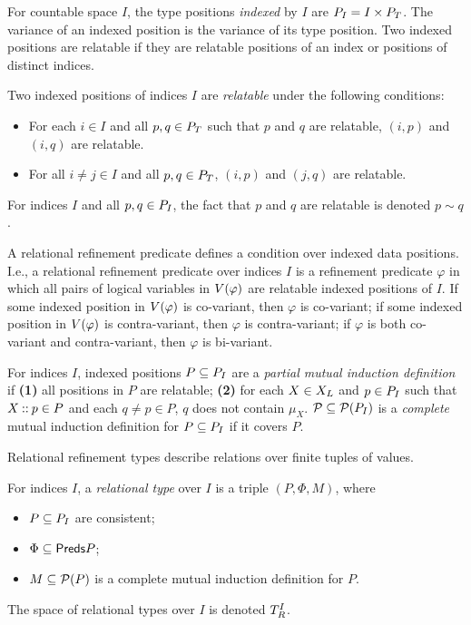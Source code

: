 For countable space $I$, the type positions \emph{indexed} by $I$ are
$P_{I} = I \times P_T$.
%
The variance of an indexed position is the variance of its type
position.
%
Two indexed positions are relatable if they are relatable positions of
an index or positions of distinct indices.
%
\begin{defn}
  \label{defn:reltable-idx-pos}
  Two indexed positions of indices $I$ are \emph{relatable} under the
  following conditions:
  \begin{itemize}
  \item %
    For each $i \in I$ and all $p, q \in P_T$ such that $p$ and $q$
    are relatable, $(i, p)$ and $(i, q)$ are relatable.
  \item %
    For all $i \not= j \in I$ and all $p, q \in P_T$, $(i, p)$ and
    $(j, q)$ are relatable.
  \end{itemize}
\end{defn}
%
For indices $I$ and all $p, q \in P_{I}$, the fact that $p$ and
$q$ are relatable is denoted $p \sim q$.

A relational refinement predicate defines a condition over indexed
data positions.
%
I.e., a relational refinement predicate over indices $I$ is a
refinement predicate $\varphi$ in which all pairs of logical variables
in $V(\varphi)$ are relatable indexed positions of $I$.
%
If some indexed position in $V(\varphi)$ is co-variant, then
$\varphi$ is co-variant;
%
if some indexed position in $V(\varphi)$ is contra-variant, then
$\varphi$ is contra-variant;
%
if $\varphi$ is both co-variant and contra-variant, then $\varphi$ is
bi-variant.

For indices $I$, indexed positions $P \subseteq P_{I}$ are a
\emph{partial mutual induction definition} if %
\textbf{(1)} all positions in $P$ are relatable; %
\textbf{(2)} for each $X \in X_L$ and $p \in P_{I}$ such
that $X \mathbin{::} p \in P$ and each $q \not= p \in P$, $q$ does not
contain $\mu_X$.
%
$\mathcal{P} \subseteq \mathcal{P}(P_{I})$ is a \emph{complete} mutual
induction definition for $P \subseteq P_{I}$ if it covers $P$.

Relational refinement types describe relations over finite tuples of
values.
%
\begin{defn}
  \label{defn:rel-types}
  For indices $I$, a \emph{relational type} over $I$ is a triple
  $(P, \Phi, M)$, where
  \begin{itemize}
  \item %
    $P \subseteq P_{I}$ are consistent;
  \item %
    $\Phi \subseteq \mathsf{Preds}{P}$;
  \item %
    $M \subseteq \mathcal{P}(P)$ is a complete mutual induction definition
    for $P$.
  \end{itemize}
\end{defn}
%
The space of relational types over $I$ is denoted $T_{R}^{I}$.

